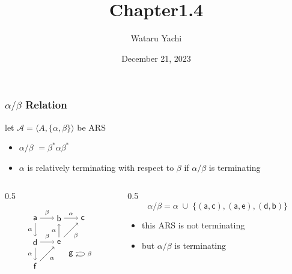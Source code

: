 \documentclass[12pt,aspectratio=169]{beamer}
\title{ Chapter1.4 }
\author{Wataru Yachi}
\institute{JAIST}
\date{December 21, 2023}
\newcommand{\m}[1]{\mathsf{#1}}
\newlength{\mytotalwidth}
\newlength{\mycolumnwidth}
\begin{document}
\maketitle

\newcommand{\MA}{\mathcal{A}}
\newcommand{\AB}{\alpha/\beta}

\begin{frame}[fragile]
    \frametitle{$\alpha/\beta$ Relation}
    \begin{definition}
        let $\MA = \langle A, \{\alpha,\beta\} \rangle$ be ARS
        \begin{itemize}
            \item \alert{$\AB$} $= \beta^*\alpha\beta^*$
            \item $\alpha$ is \alert{relatively terminating} with respect to $\beta$ if $\AB$ is terminating 
        \end{itemize}
    \end{definition}
    \pause
    \begin{example}
    \begin{columns}[totalwidth=\mytotalwidth]
    \begin{column}[t]{0.5\mycolumnwidth}
    \[
            \begin{tikzpicture}[auto]
                \node (a) at (0,0) {$\m{a}$}; \node (b) at (1,0) {$\m{b}$}; \node (c) at (2,0) {$\m{c}$};
                \node (d) at (0,-1) {$\m{d}$}; \node (e) at (1,-1) {$\m{e}$};
                \node (f) at (0,-2) {$\m{f}$}; \node (g) at (1.5, -1.5) {$\m{g}$};

                \draw[->] (a) to node [above]{$\scriptstyle\beta$}(b);
                \draw[->] (b) to node [above]{$\scriptstyle\alpha$} (c);
                \draw[->] (a) to [swap]node{$\scriptstyle \alpha$} (d);
                \draw[->] (d) to [swap]node{$\scriptstyle \alpha$} (f);
                \draw[->] (d) to node{$\scriptstyle \beta$}  (e);
                \draw[->] (f) to [swap]node{$\scriptstyle \alpha$} (e);
                \draw[->] (e) to node{$\scriptstyle \alpha$} (b);
                \draw[->] (e) to [swap]node{$\scriptstyle \beta$}  (c);
                \draw[->,loop right] (g) to node{$\scriptstyle \beta$} (g);
            \end{tikzpicture}
        \]
    \end{column}
        \pause
    \begin{column}[t]{0.5\mycolumnwidth}
            \[
                \alpha/\beta = \alpha \;\cup\; \{
                        (\m{a}, \m{c}), (\m{a},\m{e}), (\m{d},\m{b})\}
            \]
            \pause
            \begin{itemize}
                \item this ARS is not terminating
                \item but $\alpha/\beta$ is terminating
            \end{itemize}
    \end{column}
    \end{columns}
    \end{example}
\end{frame}
\end{document}
